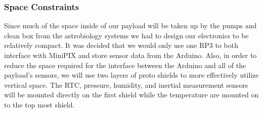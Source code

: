\subsubsection{Space Constraints}
Since much of the space inside of our payload will be taken up by the pumps and clean box from the astrobiology systems we had to design our electronics to be relatively compact.  It was decided that we would only use one RP3 to both interface with MiniPIX and store sensor data from the Arduino.  Also, in order to reduce the space required for the interface between the Arduino and all of the payload's sensors, we will use two layers of proto shields to more effectively utilize vertical space.
The RTC, pressure, humidity, and inertial measurement sensors will be mounted directly on the first shield while the temperature are mounted on to the top most shield. 


